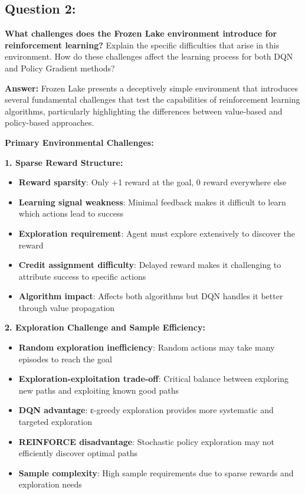 \documentclass[12pt]{article}
\begin{document}
{{{\subsection{Question 2:}
\textbf{ What challenges does the Frozen Lake environment introduce for reinforcement learning?}
\newline
Explain the specific difficulties that arise in this environment. How do these challenges affect the learning process for both DQN and Policy Gradient methods?

\textbf{Answer:} Frozen Lake presents a deceptively simple environment that introduces several fundamental challenges that test the capabilities of reinforcement learning algorithms, particularly highlighting the differences between value-based and policy-based approaches.

\textbf{Primary Environmental Challenges:}

\textbf{1. Sparse Reward Structure:}
\begin{itemize}
    \item \textbf{Reward sparsity}: Only +1 reward at the goal, 0 reward everywhere else
    \item \textbf{Learning signal weakness}: Minimal feedback makes it difficult to learn which actions lead to success
    \item \textbf{Exploration requirement}: Agent must explore extensively to discover the reward
    \item \textbf{Credit assignment difficulty}: Delayed reward makes it challenging to attribute success to specific actions
    \item \textbf{Algorithm impact}: Affects both algorithms but DQN handles it better through value propagation
\end{itemize}

\textbf{2. Exploration Challenge and Sample Efficiency:}
\begin{itemize}
    \item \textbf{Random exploration inefficiency}: Random actions may take many episodes to reach the goal
    \item \textbf{Exploration-exploitation trade-off}: Critical balance between exploring new paths and exploiting known good paths
    \item \textbf{DQN advantage}: ε-greedy exploration provides more systematic and targeted exploration
    \item \textbf{REINFORCE disadvantage}: Stochastic policy exploration may not efficiently discover optimal paths
    \item \textbf{Sample complexity}: High sample requirements due to sparse rewards and exploration needs
\end{itemize}

}}}
\end{document}
